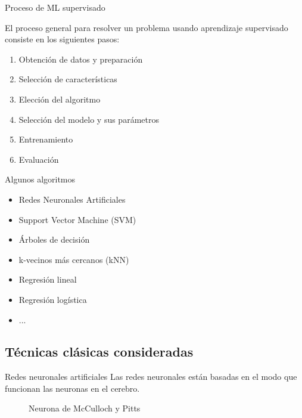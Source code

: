 \documentclass[hyperref={unicode}]{beamer}
\begin{document}
\begin{frame}{Proceso de ML supervisado}

El proceso general para resolver un problema usando aprendizaje supervisado consiste en los siguientes pasos:\\

	\begin{enumerate}
		\item \pause Obtención de datos y preparación
		
		\item \pause Selección de características
		
		\item \pause Elección del algoritmo 
		
		\item \pause Selección del modelo y sus parámetros
		
		\item \pause Entrenamiento
		
		\item \pause Evaluación
	\end{enumerate}
\end{frame}


\begin{frame}{Algunos algoritmos}
	\begin{itemize}
		\item Redes Neuronales Artificiales
			\item Support Vector Machine (SVM)
			\item Árboles de decisión
			\item k-vecinos más cercanos (kNN)
			\item Regresión lineal
			\item Regresión logística
			\item ...
	\end{itemize}
\end{frame}


\subsection{Técnicas clásicas consideradas}
\begin{frame}{Redes neuronales artificiales}
	Las redes neuronales están basadas en el modo que funcionan las neuronas en el cerebro.\\
	
	
	\begin{figure}[htbp!]
	\centering
	\resizebox{!}{0.5\width}{\neuronaMcCullochPitts}
		
	\caption{Neurona de McCulloch y Pitts}
	\end{figure}
\end{frame}
\end{document}
